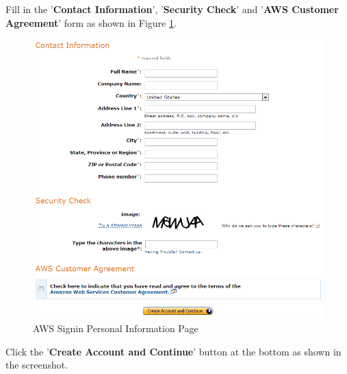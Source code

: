 Fill in the '\textbf{Contact Information}', '\textbf{Security Check}' and '\textbf{AWS Customer Agreement}' form as shown in Figure \ref{fig:aws.personal.info}.
\begin{figure}[ht]
  \centering
  \includegraphics[width=.8\textwidth]{figs/5163os_08_03.png}
  \caption{AWS Signin Personal Information Page}\label{fig:aws.personal.info}
\end{figure} 
Click the '\textbf{Create Account and Continue}' button at the bottom as shown in the screenshot.

